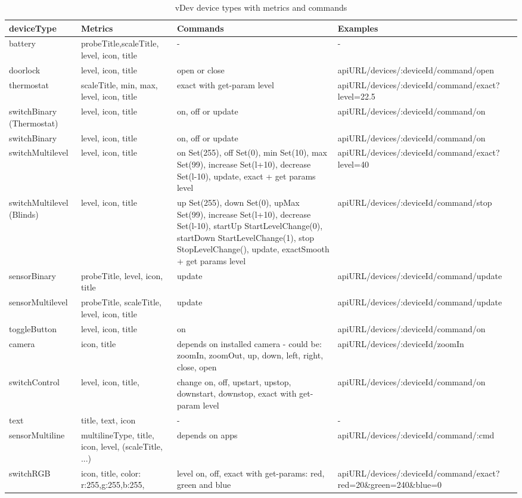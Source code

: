 \begin{table}
\scriptsize
\begin{tabular}{|p{}|p{}|p{}|p{}|}
\hline
deviceType	&Metrics	&Commands	&Examples\\
\hline
battery	&probeTitle,scaleTitle, level, icon, title	&-	&- \\
\hline
doorlock	&level, icon, title	&open or close	&apiURL/devices/:deviceId/command/open\\
\hline
thermostat	&scaleTitle, min, max, level, icon, title	&exact with get-param level	&apiURL/devices/:deviceId/command/exact?
level=22.5\\
\hline
switchBinary (Thermostat)	&level, icon, title	&on, off or update&	apiURL/devices/:deviceId/command/on\\
\hline
switchBinary&	level, icon, title	&on, off or update	&apiURL/devices/:deviceId/command/on\\
\hline
switchMultilevel	&level, icon, title	& on Set(255), off Set(0), min Set(10), max Set(99), increase Set(l+10), decrease Set(l-10), update, exact + get params level	&apiURL/devices/:deviceId/command/exact? level=40 \\
\hline
switchMultilevel (Blinds)&	level, icon, title	&up Set(255), down Set(0), upMax Set(99), increase Set(l+10), decrease Set(l-10), startUp StartLevelChange(0), startDown StartLevelChange(1), stop StopLevelChange(), update, exactSmooth + get params level	& apiURL/devices/:deviceId/command/stop  \\
\hline
sensorBinary	&probeTitle, level, icon, title	&update	&apiURL/devices/:deviceId/command/update\\
\hline
sensorMultilevel	&probeTitle, scaleTitle, level, icon, title	&update	&apiURL/devices/:deviceId/command/update \\
\hline
toggleButton	&level, icon, title&	on	&apiURL/devices/:deviceId/command/on \\
\hline
camera	&icon, title	&depends on installed camera - could be: zoomIn, zoomOut, up, down, left, right, close, open	&apiURL/devices/:deviceId/zoomIn \\
\hline
switchControl	&level, icon, title,& change	on, off, upstart, upstop, downstart, downstop, exact with get-param level	&apiURL/devices/:deviceId/command/on \\
\hline
text	&title, text, icon	&-	&- \\
\hline
sensorMultiline	&multilineType, title, icon, level, (scaleTitle, ...)	&depends on apps	&apiURL/devices/:deviceId/command/:cmd \\
\hline
switchRGB	&icon, title, color: {r:255,g:255,b:255}, &level	on, off, exact with get-params: red, green and blue	& apiURL/devices/:deviceId/command/exact?
red=20\&green=240\&blue=0 \\
\hline
\end{tabular}
\caption{vDev device types with metrics and commands} 
\label{tab:devicetypes}
\end{table}	

